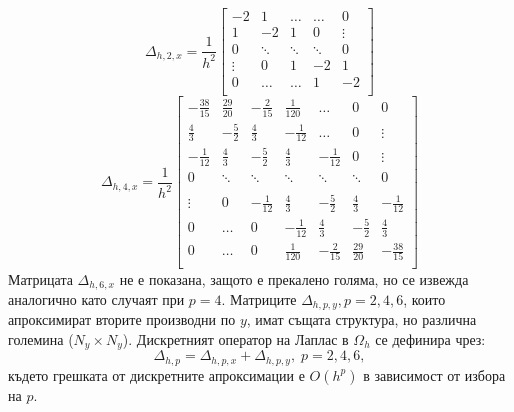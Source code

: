 \documentclass[a5paper]{article}
\newcommand{\be}{\begin{equation}}
\newcommand{\ee}{\end{equation}}
\theoremstyle{remark}
\begin{document}
\begin{large}
\[
\Delta_{h,2,x} = \frac{1}{h^2}
\begin{bmatrix}
    -2	       & 1        &     \dots   &   \dots        & 0   \\
    1               & -2            &   1           &   0               & \vdots    \\
        0           & \ddots        &    \ddots    &   \ddots       &  0 \\ 
    \vdots       &     0            &  1     	& -2    	   & 1 \\
    0               & \dots          &  \dots         & 1  	   & -2 \\
\end{bmatrix}
\]
\[
\Delta_{h,4,x} = \frac{1}{h^2}
\begin{bmatrix}
     -\frac{38}{15}	& \frac{29}{20}       & -\frac{2}{15}	&    \frac{1}{120}     &    \dots      	   &   0           & 0    \\
    \frac{4}{3}          &-\frac{5}{2}    	& \frac{4}{3}	&   -\frac{1}{12}	  &   \dots      	  &   0	           & \vdots  \\
    -\frac{1}{12}	& \frac{4}{3}         	& -\frac{5}{2}	&  \frac{4}{3}    	 &   -\frac{1}{12}	  &      0           &\vdots    \\
        0           		& \ddots        	&    \ddots   		 &   \ddots      	 &     \ddots      	  &  \ddots        &    0 \\	
\\
   \vdots      		 & 0           		 &  -\frac{1}{12}	& \frac{4}{3}    	& -\frac{5}{2}	&  \frac{4}{3}   &   -\frac{1}{12} \\
    0      		 &  \dots           	 &   0     		& -\frac{1}{12} 	 & \frac{4}{3} 	 & -\frac{5}{2}  &  \frac{4}{3}\\
    0              		 & \dots          	&  0              		 &\frac{1}{120} 	 &  -\frac{2}{15} 	& \frac{29}{20} & -\frac{38}{15}\\
\end{bmatrix}
\]
Матрицата $\Delta_{h,6,x}$ не е показана, защото е прекалено голяма, но се извежда аналогично като случаят при $p=4$. Матриците $\Delta_{h,p,y}, p=2,4,6$, които апроксимират вторите производни по $y$, имат същата структура, но различна големина ($N_y \times N_y$).  Дискретният оператор на Лаплас в $\Omega_h$  се дефинира чрез:
\be
\Delta_{h,p} = \Delta_{h,p,x} + \Delta_{h,p,y}, \; p=2,4,6,
\ee
където грешката от дискретните апроксимации е $O(h^p)$ в зависимост от избора на $p$.


\end{large}
\end{document}
